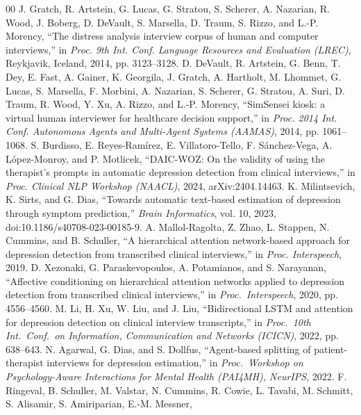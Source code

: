 \documentclass[conference]{IEEEtran}
\begin{document}
\begin{thebibliography}{00}
 J. Gratch, R. Artstein, G. Lucas, G. Stratou, S. Scherer,
A. Nazarian, R. Wood, J. Boberg, D. DeVault, S. Marsella, D. Traum, S. Rizzo,
and L.-P. Morency, ``The distress analysis interview corpus of human and
computer interviews,'' in \emph{Proc. 9th Int. Conf. Language Resources and
Evaluation (LREC)}, Reykjavik, Iceland, 2014, pp. 3123--3128.
 D. DeVault, R. Artstein, G. Benn, T. Dey, E. Fast,
A. Gainer, K. Georgila, J. Gratch, A. Hartholt, M. Lhommet, G. Lucas,
S. Marsella, F. Morbini, A. Nazarian, S. Scherer, G. Stratou, A. Suri,
D. Traum, R. Wood, Y. Xu, A. Rizzo, and L.-P. Morency, ``SimSensei kiosk: a
virtual human interviewer for healthcare decision support,'' in \emph{Proc.
2014 Int. Conf. Autonomous Agents and Multi-Agent Systems (AAMAS)}, 2014,
pp. 1061--1068.
 S. Burdisso, E. Reyes-Ram\'irez, E. Villatoro-Tello,
F. S\'anchez-Vega, A. L\'opez-Monroy, and P. Motlicek, ``DAIC-WOZ: On the
validity of using the therapist's prompts in automatic depression detection
from clinical interviews,'' in \emph{Proc. Clinical NLP Workshop (NAACL)},
2024, arXiv:2404.14463.
 K. Milintsevich, K. Sirts, and G. Dias, ``Towards
automatic text-based estimation of depression through symptom prediction,''
\emph{Brain Informatics}, vol. 10, 2023, doi:10.1186/s40708-023-00185-9.
 A. Mallol-Ragolta, Z. Zhao, L. Stappen, N. Cummins,
and B. Schuller, ``A hierarchical attention network-based approach for
depression detection from transcribed clinical interviews,'' in \emph{Proc.
Interspeech}, 2019.
 D. Xezonaki, G. Paraskevopoulos, A. Potamianos, and
S. Narayanan, ``Affective conditioning on hierarchical attention networks
applied to depression detection from transcribed clinical interviews,'' in
\emph{Proc.\ Interspeech}, 2020, pp. 4556--4560.
 M. Li, H. Xu, W. Liu, and J. Liu, ``Bidirectional LSTM
and attention for depression detection on clinical interview transcripts,'' in
\emph{Proc.\ 10th Int.\ Conf.\ on Information, Communication and Networks
(ICICN)}, 2022, pp. 638--643.
 N. Agarwal, G. Dias, and S. Dollfus, ``Agent-based
splitting of patient-therapist interviews for depression estimation,'' in
\emph{Proc.\ Workshop on Psychology-Aware Interactions for Mental Health
(PAI4MH), NeurIPS}, 2022.
 F. Ringeval, B. Schuller, M. Valstar, N. Cummins,
R. Cowie, L. Tavabi, M. Schmitt, S. Alisamir, S. Amiriparian, E.-M. Messner,

\end{thebibliography}
\end{document}
